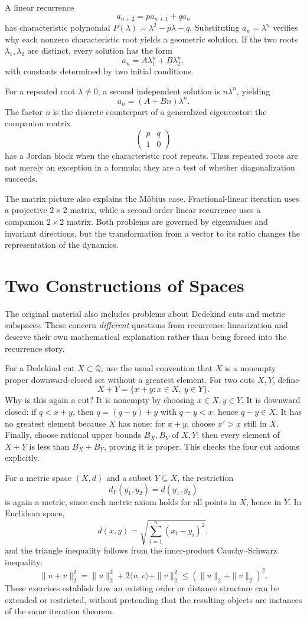 A linear recurrence
\[
 a_{n+2}=pa_{n+1}+qa_n
\]
has characteristic polynomial \(P(\lambda)=\lambda^2-p\lambda-q\). Substituting \(a_n=\lambda^n\) verifies why each nonzero characteristic root yields a geometric solution. If the two roots \(\lambda_1,\lambda_2\) are distinct, every solution has the form
\[
 a_n=A\lambda_1^n+B\lambda_2^n,
\]
with constants determined by two initial conditions.

For a repeated root \(\lambda\ne0\), a second independent solution is \(n\lambda^n\), yielding
\[
 a_n=(A+Bn)\lambda^n.
\]
The factor \(n\) is the discrete counterpart of a generalized eigenvector: the companion matrix
\[
 \begin{pmatrix}p&q\\1&0\end{pmatrix}
\]
has a Jordan block when the characteristic root repeats. Thus repeated roots are not merely an exception in a formula; they are a test of whether diagonalization succeeds.

The matrix picture also explains the Möbius case. Fractional-linear iteration uses a projective \(2\times2\) matrix, while a second-order linear recurrence uses a companion \(2\times2\) matrix. Both problems are governed by eigenvalues and invariant directions, but the transformation from a vector to its ratio changes the representation of the dynamics.

\section{Two Constructions of Spaces}

The original material also includes problems about Dedekind cuts and metric subspaces. These concern \emph{different} questions from recurrence linearization and deserve their own mathematical explanation rather than being forced into the recurrence story.

For a Dedekind cut \(X\subset\mathbb Q\), use the usual convention that \(X\) is a nonempty proper downward-closed set without a greatest element. For two cuts \(X,Y\), define
\[
 X+Y=\{x+y:x\in X,\ y\in Y\}.
\]
Why is this again a cut? It is nonempty by choosing \(x\in X,y\in Y\). It is downward closed: if \(q<x+y\), then
\(q=(q-y)+y\) with \(q-y<x\), hence \(q-y\in X\). It has no greatest element because \(X\) has none: for \(x+y\), choose \(x'>x\) still in \(X\). Finally, choose rational upper bounds \(B_X,B_Y\) of \(X,Y\); then every element of \(X+Y\) is less than \(B_X+B_Y\), proving it is proper. This checks the four cut axioms explicitly.

For a metric space \((X,d)\) and a subset \(Y\subseteq X\), the restriction
\[
 d_Y(y_1,y_2)=d(y_1,y_2)
\]
is again a metric, since each metric axiom holds for all points in \(X\), hence in \(Y\). In Euclidean space,
\[
 d(x,y)=\sqrt{\sum_{i=1}^n(x_i-y_i)^2},
\]
and the triangle inequality follows from the inner-product Cauchy--Schwarz inequality:
\[
 \|u+v\|_2^2
 =\|u\|_2^2+2\langle u,v\rangle+\|v\|_2^2
 \le(\|u\|_2+\|v\|_2)^2.
\]
These exercises establish how an existing order or distance structure can be extended or restricted, without pretending that the resulting objects are instances of the same iteration theorem.
